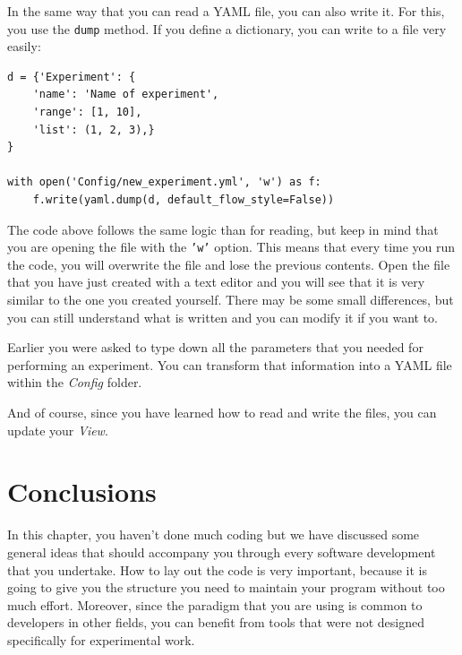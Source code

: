 
In the same way that you can read a {YAML} file, you can also write it.
For this, you use the \texttt{dump} method. If you define a dictionary,
you can write to a file very easily:

\begin{verbatim}
d = {'Experiment': {
    'name': 'Name of experiment',
    'range': [1, 10],
    'list': (1, 2, 3),}
}

with open('Config/new_experiment.yml', 'w') as f:
    f.write(yaml.dump(d, default_flow_style=False))
\end{verbatim}

The code above follows the same logic than for reading, but keep in mind
that you are opening the file with the
\texttt{'w'} option. This means that
every time you run the code, you will overwrite the file and lose the
previous contents. Open the file that you have just created with a text
editor and you will see that it is very similar to the one you created
yourself. There may be some small differences, but you can still
understand what is written and you can modify it if you want to.


Earlier you were asked to type down all the parameters that you needed
for performing an experiment. You can transform that information into a
{YAML} file within the \emph{Config} folder.


And of course, since you have learned how to read and write the files,
you can update your \emph{View}.


\section{Conclusions}\label{conclusions}

In this chapter, you haven't done much coding but we have discussed some
general ideas that should accompany you through every software
development that you undertake. How to lay out the code is very
important, because it is going to give you the structure you need to
maintain your program without too much effort. Moreover, since the paradigm that you are using is common to developers in other fields, you
can benefit from tools that were not designed specifically for
experimental work.


